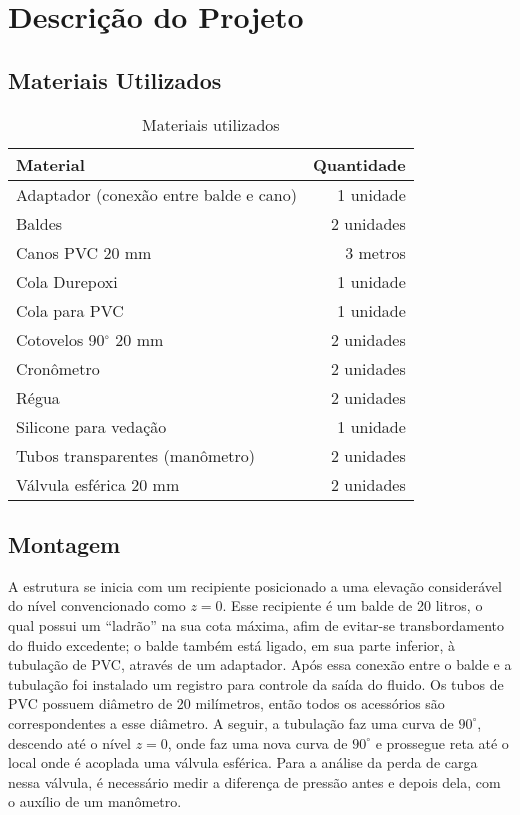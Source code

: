 \chapter{Descrição do Projeto}\label{descricao}

\section{Materiais Utilizados}

 \begin{table}[H]\label{t:custos}
     \centering
     \begin{tabular}{l r}
         \toprule
         \textbf{Material} & \textbf{Quantidade} \\
         \midrule
         Adaptador (conexão entre balde e cano) & 1 unidade \\
         Baldes & 2 unidades \\
         Canos PVC 20 mm &  3 metros \\
         Cola Durepoxi & 1 unidade \\
         Cola para PVC & 1 unidade \\
         Cotovelos 90$^\circ$ 20 mm & 2 unidades \\
         Cronômetro & 2 unidades \\
         Régua & 2 unidades \\
         Silicone para vedação & 1 unidade \\
         Tubos transparentes (manômetro) & 2 unidades \\
         Válvula esférica 20 mm & 2 unidades \\
         \bottomrule
     \end{tabular}
     \caption{Materiais utilizados}
 \end{table}

\section{Montagem}
\label{sec:montagem}

A estrutura se inicia com um recipiente posicionado a uma elevação considerável
do nível convencionado como $z = 0$. Esse recipiente é um balde de 20 litros, o
qual possui um ``ladrão'' na sua cota máxima, afim de evitar-se transbordamento
do fluido excedente; o balde também está ligado, em sua parte inferior, à
tubulação de PVC, através de um adaptador. Após essa conexão entre o balde e a
tubulação foi instalado um registro para controle da saída do fluido. Os tubos
de PVC possuem diâmetro de 20 milímetros, então todos os acessórios são
correspondentes a esse diâmetro. A seguir, a tubulação faz uma curva de
$90^\circ$, descendo até o nível $z = 0$, onde faz uma nova curva de $90^\circ$
e prossegue reta até o local onde é acoplada uma válvula esférica. Para a
análise da perda de carga nessa válvula, é necessário medir a diferença de
pressão antes e depois dela, com o auxílio de um manômetro.


